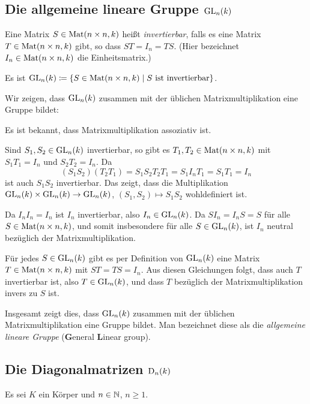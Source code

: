 \subsection{Die allgemeine lineare Gruppe \texorpdfstring{$\mathrm{GL}_n(k)$}{GLnk}}
\begin{defi}
 Eine Matrix $S \in \mathrm{Mat}(n \times n, k)$ heißt \emph{invertierbar}, falls es eine Matrix $T \in \mathrm{Mat}(n \times n, k)$ gibt, so dass $ST = I_n = TS$. (Hier bezeichnet $I_n \in \mathrm{Mat}(n \times n, k)$ die Einheitsmatrix.)
 
 Es ist $\mathrm{GL}_n(k) \coloneqq \{S \in \mathrm{Mat}(n \times n, k) \mid \text{$S$ ist invertierbar}\}$.
\end{defi}

Wir zeigen, dass $\mathrm{GL}_n(k)$ zusammen mit der üblichen Matrixmultiplikation eine Gruppe bildet:

Es ist bekannt, dass Matrixmultiplikation assoziativ ist.

Sind $S_1, S_2 \in \mathrm{GL}_n(k)$ invertierbar, so gibt es $T_1, T_2 \in \mathrm{Mat}(n \times n, k)$ mit $S_1 T_1 = I_n$ und $S_2 T_2 = I_n$. Da
\[
 (S_1 S_2) (T_2 T_1)
 = S_1 S_2 T_2 T_1
 = S_1 I_n T_1
 = S_1 T_1
 = I_n
\]
ist auch $S_1 S_2$ invertierbar. Das zeigt, dass die Multiplikation $\mathrm{GL}_n(k) \times \mathrm{GL}_n(k) \to \mathrm{GL}_n(k)$, $(S_1, S_2) \mapsto S_1 S_2$ wohldefiniert ist.

Da $I_n I_n = I_n$ ist $I_n$ invertierbar, also $I_n \in \mathrm{GL}_n(k)$. Da $S I_n = I_n S = S$ für alle $S \in \mathrm{Mat}(n \times n, k)$, und somit insbesondere für alle $S \in \mathrm{GL}_n(k)$, ist $I_n$ neutral bezüglich der Matrixmultiplikation.

Für jedes $S \in \mathrm{GL}_n(k)$ gibt es per Definition von $\mathrm{GL}_n(k)$ eine Matrix $T \in \mathrm{Mat}(n \times n, k)$ mit $ST = TS = I_n$. Aus diesen Gleichungen folgt, dass auch $T$ invertierbar ist, also $T \in \mathrm{GL}_n(k)$, und dass $T$ bezüglich der Matrixmultiplikation invers zu $S$ ist.

Insgesamt zeigt dies, dass $\mathrm{GL}_n(k)$ zusammen mit der üblichen Matrixmultiplikation eine Gruppe bildet. Man bezeichnet diese als die \emph{allgemeine lineare Gruppe} (\textbf{G}eneral \textbf{L}inear group).



\subsection{Die Diagonalmatrizen \texorpdfstring{$\mathrm{D}_n(k)$}{Dn(k)}}
Es sei $K$ ein Körper und $n \in \mathbb{N}$, $n \geq 1$.

